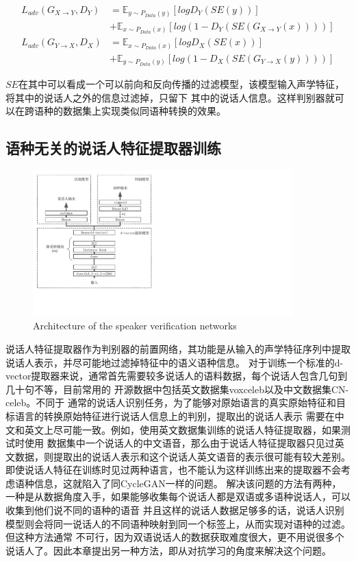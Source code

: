 \begin{align}
    L_{adv}(G_{X\rightarrow Y},D_Y) & =\mathbb{E}_{y\sim P_{Data}(y)}\left[log D_Y(SE(y))\right] \\
    & + \mathbb{E}_{x\sim P_{Data}(x)}\left[log(1-D_Y(SE(G_{X\rightarrow Y}(x))))\right] \\
    L_{adv}(G_{Y\rightarrow X},D_X) & =\mathbb{E}_{x\sim P_{Data}(x)}\left[log D_X(SE(x))\right] \\
    & + \mathbb{E}_{y\sim P_{Data}(y)}\left[log(1-D_X(SE(G_{Y\rightarrow X}(y))))\right]
\end{align}

$SE$在其中可以看成一个可以前向和反向传播的过滤模型，该模型输入声学特征，将其中的说话人之外的信息过滤掉，只留下
其中的说话人信息。这样判别器就可以在跨语种的数据集上实现类似同语种转换的效果。



\subsection{语种无关的说话人特征提取器训练}


\begin{figure}[!htp]
    \centering
    \includegraphics[width=10cm,trim=0 79 380 0,clip]{figure/5_d.pdf}
    {Architecture of the speaker verification networks}
    \label{fig:5d}
\end{figure}

说话人特征提取器作为判别器的前置网络，其功能是从输入的声学特征序列中提取说话人表示，并尽可能地过滤掉特征中的语义语种信息。
对于训练一个标准的d-vector提取器来说，通常首先需要较多说话人的语料数据，每个说话人包含几句到几十句不等，目前常用的
开源数据中包括英文数据集voxceleb\cite{nagrani2017voxceleb}以及中文数据集CN-celeb\cite{fan2019cn}。不同于
通常的说话人识别任务，为了能够对原始语言的真实原始特征和目标语言的转换原始特征进行说话人信息上的判别，提取出的说话人表示
需要在中文和英文上尽可能一致。例如，使用英文数据集训练的说话人特征提取器，如果测试时使用
数据集中一个说话人的中文语音，那么由于说话人特征提取器只见过英文数据，则提取出的说话人表示和这个说话人英文语音的表示很可能有较大差别。
即使说话人特征在训练时见过两种语言，也不能认为这样训练出来的提取器不会考虑语种信息，这就陷入了同CycleGAN一样的问题。
解决该问题的方法有两种，一种是从数据角度入手，如果能够收集每个说话人都是双语或多语种说话人，可以收集到他们说不同的语种的语音
并且这样的说话人数据足够多的话，说话人识别模型则会将同一说话人的不同语种映射到同一个标签上，从而实现对语种的过滤。但这种方法通常
不可行，因为双语说话人的数据获取难度很大，更不用说很多个说话人了。因此本章提出另一种方法，即从对抗学习的角度来解决这个问题。

